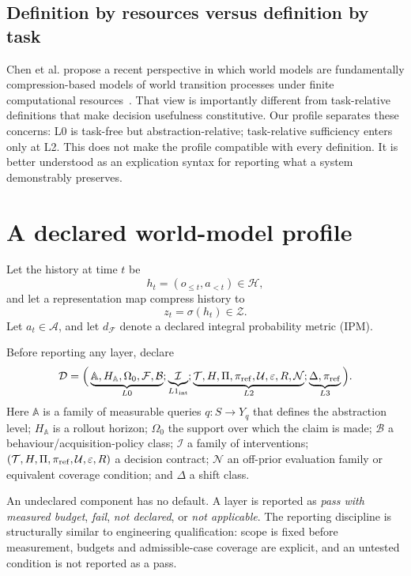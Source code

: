 \documentclass[10pt]{article}
\newcommand{\Aabs}{\mathbb A}
\begin{document}
\subsection{Definition by resources versus definition by task}

Chen et al. propose a recent perspective in which world models are fundamentally compression-based models of world transition processes under finite computational resources~\cite{chen2026}. That view is importantly different from task-relative definitions that make decision usefulness constitutive. Our profile separates these concerns: L0 is task-free but abstraction-relative; task-relative sufficiency enters only at L2. This does not make the profile compatible with every definition. It is better understood as an explication syntax for reporting what a system demonstrably preserves.

\section{A declared world-model profile}

Let the history at time $t$ be
\[
h_t=(o_{\le t},a_{<t})\in\mathcal H,
\]
and let a representation map compress history to
\[
z_t=\sigma(h_t)\in\mathcal Z.
\]
Let $a_t\in\mathcal A$, and let $d_{\mathcal F}$ denote a declared integral probability metric (IPM).

Before reporting any layer, declare
\[
\mathcal D=
\Big(
\underbrace{\Aabs,H_{\Aabs},\Omega_0,\mathcal F,\mathcal B}_{L0};
\underbrace{\mathcal I}_{L1_{\rm int}};
\underbrace{\mathcal T,H,\Pi,\pi_{\rm ref},\mathcal U,\varepsilon,R,\mathcal N}_{L2};
\underbrace{\Delta,\pi_{\rm ref}}_{L3}
\Big).
\]
Here $\Aabs$ is a family of measurable queries $q:S\to Y_q$ that defines the abstraction level; $H_{\Aabs}$ is a rollout horizon; $\Omega_0$ the support over which the claim is made; $\mathcal B$ a behaviour/acquisition-policy class; $\mathcal I$ a family of interventions; $(\mathcal T,H,\Pi,\pi_{\rm ref},\mathcal U,\varepsilon,R)$ a decision contract; $\mathcal N$ an off-prior evaluation family or equivalent coverage condition; and $\Delta$ a shift class.

An undeclared component has no default. A layer is reported as \emph{pass with measured budget}, \emph{fail}, \emph{not declared}, or \emph{not applicable}. The reporting discipline is structurally similar to engineering qualification: scope is fixed before measurement, budgets and admissible-case coverage are explicit, and an untested condition is not reported as a pass.
\end{document}
